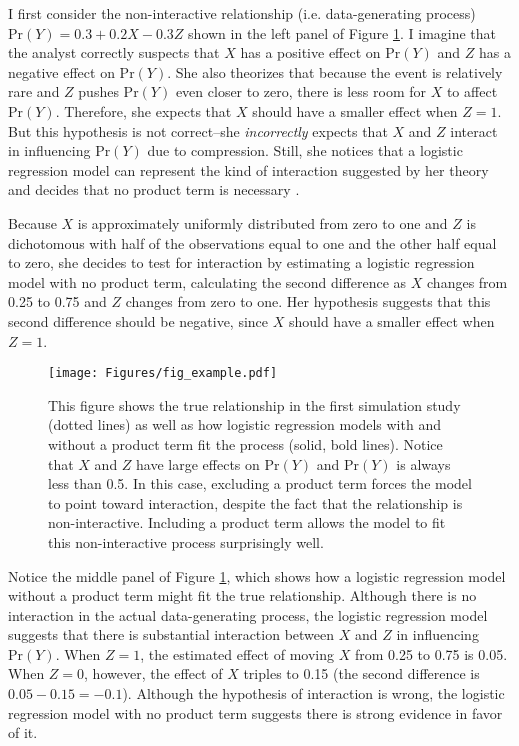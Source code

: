 \documentclass[12pt]{article}
\begin{document}
I first consider the non-interactive relationship (i.e. data-generating process) $\text{Pr}(Y) = 0.3 + 0.2X - 0.3Z$ shown in the left panel of Figure \ref{fig:relationships_fits}. I imagine that the analyst correctly suspects that $X$ has a positive effect on $\text{Pr}(Y)$ and $Z$ has a negative effect on $\text{Pr}(Y)$.  She also theorizes that because the event is relatively rare and $Z$ pushes $\text{Pr}(Y)$ even closer to zero,  there is less room for $X$ to affect $\text{Pr}(Y)$. Therefore, she expects that $X$ should have a smaller effect when $Z=1$. But this hypothesis is not correct--she \textit{incorrectly} expects that $X$ and $Z$ interact in influencing $\text{Pr}(Y)$ due to compression. Still, she notices that a logistic regression model can represent the kind of interaction suggested by her theory and decides that no product term is necessary \citep{BerryDeMerittEsarey2010}. 

Because $X$ is approximately uniformly distributed from zero to one and $Z$ is dichotomous with half of the observations equal to one and the other half equal to zero, she decides to test for interaction by estimating a logistic regression model with no product term, calculating the second difference as $X$ changes from 0.25 to 0.75 and $Z$ changes from zero to one. Her hypothesis suggests that this second difference should be negative, since $X$ should have a smaller effect when $Z=1$.

\begin{figure}[H]
\begin{center}
\texttt{[image: Figures/fig\_example.pdf]}
\end{center}
\caption{This figure shows the true relationship in the first simulation study (dotted lines) as well as how logistic regression models with and without a product term fit the process (solid, bold lines). Notice that $X$ and $Z$ have large effects on $\text{Pr}(Y)$ and $\text{Pr}(Y)$ is always less than 0.5. In this case, excluding a product term forces the model to point toward interaction, despite the fact that the relationship is non-interactive. Including a product term allows the model to fit this non-interactive process surprisingly well.}\label{fig:relationships_fits}
\end{figure}

Notice the middle panel of Figure \ref{fig:relationships_fits}, which shows how a logistic regression model without a product term might fit the true relationship. Although there is no interaction in the actual data-generating process, the logistic regression model suggests that there is  substantial interaction between $X$ and $Z$ in influencing $\text{Pr}(Y)$. When $Z=1$, the estimated effect of moving $X$ from 0.25 to 0.75 is 0.05. When $Z=0$, however, the effect of $X$ triples to 0.15 (the second difference is $0.05 - 0.15 = -0.1$). Although the hypothesis of interaction is wrong, the logistic regression model with no product term suggests there is strong evidence in favor of it.
\end{document}
